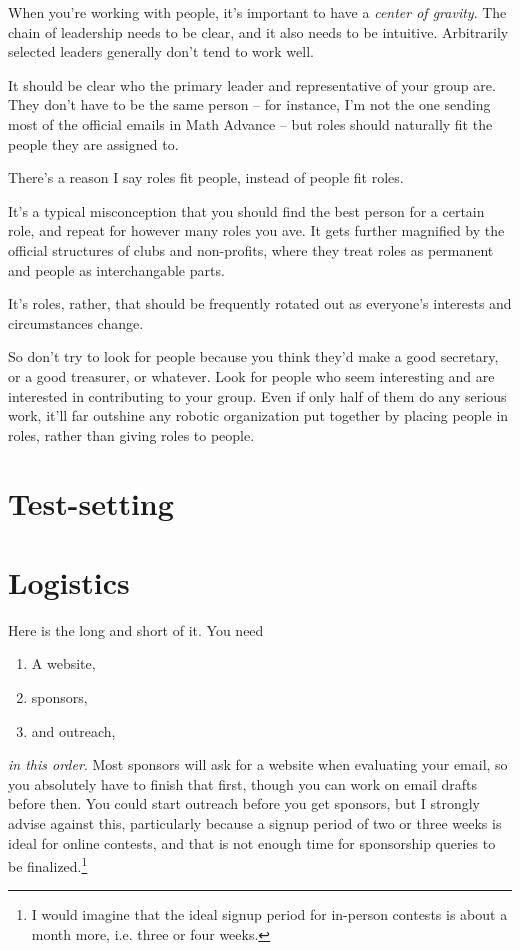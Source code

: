 \documentclass[points=false]{bounce}
\begin{document}
When you're working with people,
it's important to have a \emph{center of gravity}.
The chain of leadership needs to be clear, and it also needs to be intuitive. Arbitrarily selected leaders generally don't tend to work well.

It should be clear who the primary leader and representative of your group are. They don't have to be the same person -- for instance, I'm not the one sending most of the official emails in Math Advance -- but roles should naturally fit the people they are assigned to.

There's a reason I say roles fit people, instead of people fit roles.

It's a typical misconception that you should find the best person for a certain role, and repeat for however many roles you ave.
It gets further magnified by the official structures of clubs and non-profits, where they treat roles as permanent and people as interchangable parts.

It's roles, rather, that should be frequently rotated out as everyone's interests and circumstances change.

So don't try to look for people because you think they'd make a good secretary, or a good treasurer, or whatever. Look for people who seem interesting and are interested in contributing to your group. Even if only half of them do any serious work, it'll far outshine any robotic organization put together by placing people in roles, rather than giving roles to people.

\section{Test-setting}

\section{Logistics}

Here is the long and short of it. You need
\begin{enumerate}
    \item A website,
    \item sponsors,
    \item and outreach,
\end{enumerate}
\emph{in this order}. Most sponsors will ask for a website when evaluating your email, so you absolutely have to finish that first, though you can work on email drafts before then. You could start outreach before you get sponsors, but I strongly advise against this, particularly because a signup period of two or three weeks is ideal for online contests, and that is not enough time for sponsorship queries to be finalized.\footnote{I would imagine that the ideal signup period for in-person contests is about a month more, i.e. three or four weeks.}
\end{document}

